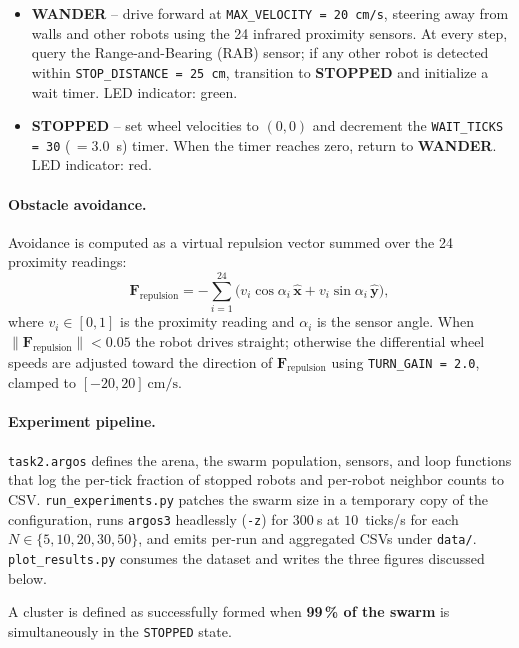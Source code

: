 \documentclass[12pt, a4paper]{article}
\begin{document}
\begin{itemize}
    \item \textbf{WANDER} -- drive forward at \texttt{MAX\_VELOCITY = 20~cm/s},
          steering away from walls and other robots using the 24 infrared
          proximity sensors.  At every step, query the Range-and-Bearing (RAB)
          sensor; if any other robot is detected within
          \texttt{STOP\_DISTANCE = 25~cm}, transition to \textbf{STOPPED} and
          initialize a wait timer.  LED indicator: green.
    \item \textbf{STOPPED} -- set wheel velocities to $(0, 0)$ and decrement
          the \texttt{WAIT\_TICKS = 30} (\,$=3.0$~s) timer.  When the timer
          reaches zero, return to \textbf{WANDER}.  LED indicator: red.
\end{itemize}

\paragraph{Obstacle avoidance.}
Avoidance is computed as a virtual repulsion vector summed over the 24
proximity readings:
\[
    \mathbf{F}_{\text{repulsion}} = -\sum_{i=1}^{24}
        \bigl(v_i \cos\alpha_i\,\mathbf{\hat x} +
              v_i \sin\alpha_i\,\mathbf{\hat y}\bigr),
\]
where $v_i \in [0, 1]$ is the proximity reading and $\alpha_i$ is the sensor
angle.  When $\|\mathbf{F}_{\text{repulsion}}\| < 0.05$ the robot drives
straight; otherwise the differential wheel speeds are adjusted toward the
direction of $\mathbf{F}_{\text{repulsion}}$ using \texttt{TURN\_GAIN = 2.0},
clamped to $[-20, 20]~\text{cm/s}$.

\paragraph{Experiment pipeline.}
\texttt{task2.argos} defines the arena, the swarm population, sensors, and
loop functions that log the per-tick fraction of stopped robots and per-robot
neighbor counts to CSV.  \texttt{run\_experiments.py} patches the swarm size
in a temporary copy of the configuration, runs \texttt{argos3} headlessly
(\texttt{-z}) for $300~$s at $10$~ticks/s for each $N \in \{5, 10, 20, 30,
50\}$, and emits per-run and aggregated CSVs under \texttt{data/}.
\texttt{plot\_results.py} consumes the dataset and writes the three figures
discussed below.

A cluster is defined as successfully formed when \textbf{99\,\% of the swarm}
is simultaneously in the \texttt{STOPPED} state.
\end{document}
